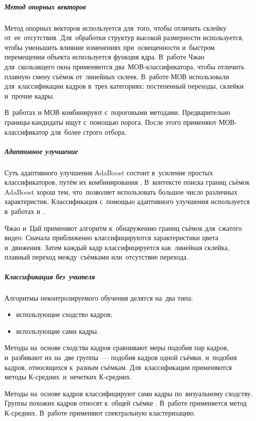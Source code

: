 \subparagraph{Метод опорных векторов}

Метод опорных векторов \cite{Ngo:2003} \cite{Camara-Chavez:2007} \cite{Matsumoto:2006}
используется для~того, чтобы отличить склейку от~ее~отсутствия.
Для~обработки структур высокой размерности используется,
чтобы уменьшить влияние изменениях при~освещенности
и~быстром перемещении объекта используется
функция ядра.
В~работе Чжао \cite{Zhao:2007} для~скользящего окна
применяются два~МОВ-классификатора,
чтобы отличить плавную смену съёмок от~линейных склеек.
В~работе \cite{Ling:2008} МОВ использовали для~классификации кадров
в~трех категориях: постепенный переходы, склейки и~прочие кадры.

В~работах \cite{Yuan:2007} и \cite{Liu:2006} МОВ
комбинируют с~пороговыми методами.
Предварительно границы-кандидаты ищут с~помощью порога.
После этого применяют МОВ-классификатор для~более строго отбора.

\subparagraph{Адаптивное улучшение}

Суть адаптивного улучшения AdaBoost состоит в~усиление простых классификаторов,
путём их комбинирования \cite{Freund:1995}.
В~контексте поиска границ съёмок AdaBoost хорош тем,
что~позволяет использовать большое число различных характеристик.
Классификация с~помощью адаптивного улучшения используется
в~работах \cite{Zhao:2006} и \cite{Herout:2007}.

Чжао и~Цай \cite{Zhao:2006} применяют алгоритм к~обнаружению границ
съёмок для~сжатого видео. Сначала приближенно классифицируются
характеристики цвета и~движения.
Затем каждый кадр классифицируется
как~линейная склейка, плавный переход между~съёмками
или~отсутствие перехода.


\subparagraph{Классификация без~учителя}

Алгоритмы  неконтролируемого обучения делятся на~два типа:
\begin{itemize}
    \item использующие сходство кадров;
    \item использующие сами кадры.
\end{itemize}

Методы на~основе сходства кадров сравнивают меры подобия пар кадров,
и~разбивают их на~две группы~— подобия кадров одной съёмки,
и~подобия кадров, относящихся к~разным съёмкам.
Для~классификации применяются методы
К-средних\ и~нечетких К-средних.

Методы на~основе кадров классифицируют сами кадры
по~визуальному сходству.
Группы похожих кадров относят к~общей съёмке \cite{Chang:2008}.
В~работе \cite{Lu:2004} применяется метод К-средних.
В~работе \cite{Damnjanovic:2007} применяют
спектральную кластеризацию.

